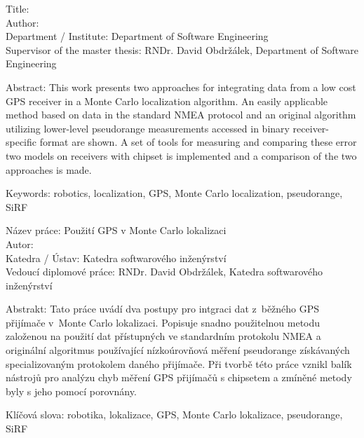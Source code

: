 \noindent
Title: \thetitle\\
Author: \theauthor\\
Department / Institute: Department of Software Engineering\\
Supervisor of the master thesis: RNDr. David Obdržálek, Department of Software Engineering

\vspace{5mm}

\noindent
Abstract: This work presents two approaches for integrating data from a low
cost GPS receiver in a Monte Carlo localization algorithm.
An easily applicable method based on data in the standard NMEA protocol and an original algorithm
utilizing lower-level pseudorange measurements accessed in binary receiver-specific
format are shown.
A set of tools for measuring and comparing these error two models on receivers
with \sirf chipset
is implemented and a comparison of the two approaches is made.

\vspace{5mm}

\noindent
Keywords: robotics, localization, GPS, Monte Carlo localization, pseudorange, SiRF

\vspace{25mm}

\noindent
Název práce: Použití GPS v Monte Carlo lokalizaci\\
Autor: \theauthor\\
Katedra / Ústav: Katedra softwarového inženýrství\\
Vedoucí diplomové práce: RNDr. David Obdržálek, Katedra softwarového inženýrství

\vspace{5mm}

\noindent
Abstrakt: Tato práce uvádí dva postupy pro intgraci dat z~běžného GPS přijímače
v~Monte Carlo lokalizaci.
Popisuje snadno použitelnou metodu založenou na použití dat přístupných ve standardním
protokolu NMEA a originální algoritmus používající nízkoúrovňová měření pseudorange
získávaných specializovaným protokolem daného přijímače.
Při tvorbě této práce vznikl balík nástrojů pro analýzu chyb měření GPS přijímačů
s chipsetem \sirf a zmíněné metody byly s jeho pomocí porovnány.

\vspace{5mm}

\noindent
Klíčová slova: robotika, lokalizace, GPS, Monte Carlo lokalizace, pseudorange, SiRF

\cleartorecto

